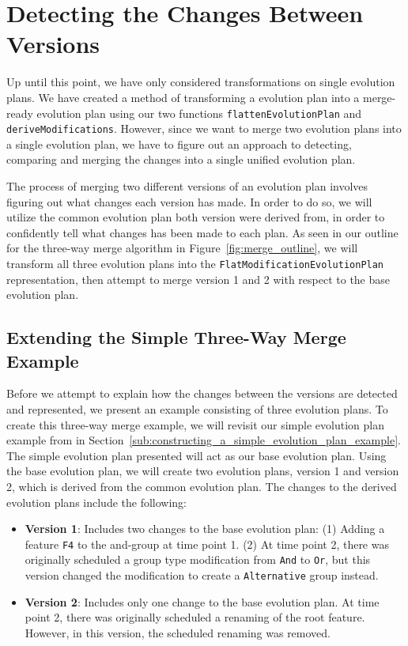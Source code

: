 \documentclass[a4paper,english]{ifimaster}
\begin{document}
\section{Detecting the Changes Between Versions}%
\label{sec:detecting_the_changes_between_versions}

Up until this point, we have only considered transformations on single evolution plans. We have created a method of transforming a evolution plan into a merge-ready evolution plan using our two functions \texttt{flatten\-Evolution\-Plan} and \texttt{derive\-Modifications}. However, since we want to merge two evolution plans into a single evolution plan, we have to figure out an approach to detecting, comparing and merging the changes into a single unified evolution plan.

The process of merging two different versions of an evolution plan involves figuring out what changes each version has made. In order to do so, we will utilize the common evolution plan both version were derived from, in order to confidently tell what changes has been made to each plan. As seen in our outline for the three-way merge algorithm in Figure~\vref{fig:merge_outline}, we will transform all three evolution plans into the \texttt{Flat\-Modification\-Evolution\-Plan} representation, then attempt to merge version 1 and 2 with respect to the base evolution plan.

\subsection{Extending the Simple Three-Way Merge Example}%
\label{sub:extending_the_simple_three_way_merge_example}

Before we attempt to explain how the changes between the versions are detected and represented, we present an example consisting of three evolution plans. To create this three-way merge example, we will revisit our simple evolution plan example from in Section~\vref{sub:constructing_a_simple_evolution_plan_example}. The simple evolution plan presented will act as our base evolution plan. Using the base evolution plan, we will create two evolution plans, version 1 and version 2, which is derived from the common evolution plan. The changes to the derived evolution plans include the following:

\begin{itemize}
  \item \textbf{Version 1}: Includes two changes to the base evolution plan: (1) Adding a feature \texttt{F4} to the and-group at time point 1. (2) At time point 2, there was originally scheduled a group type modification from \texttt{And} to \texttt{Or}, but this version changed the modification to create a \texttt{Alternative} group instead.
  \item \textbf{Version 2}: Includes only one change to the base evolution plan. At time point 2, there was originally scheduled a renaming of the root feature. However, in this version, the scheduled renaming was removed.
\end{itemize}
\end{document}
